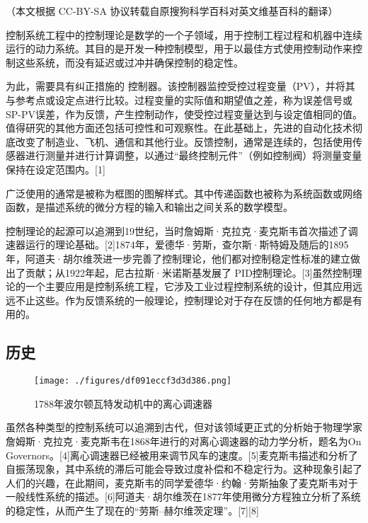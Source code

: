 
（本文根据 CC-BY-SA 协议转载自原搜狗科学百科对英文维基百科的翻译）

控制系统工程中的控制理论是数学的一个子领域，用于控制工程过程和机器中连续运行的动力系统。其目的是开发一种控制模型，用于以最佳方式使用控制动作来控制这些系统，而没有延迟或过冲并确保控制的稳定性。

为此，需要具有纠正措施的 控制器。该控制器监控受控过程变量（PV），并将其与参考点或设定点进行比较。过程变量的实际值和期望值之差，称为误差信号或SP-PV误差，作为反馈，产生控制动作，使受控过程变量达到与设定值相同的值。值得研究的其他方面还包括可控性和可观察性。在此基础上，先进的自动化技术彻底改变了制造业、飞机、通信和其他行业。反馈控制，通常是连续的，包括使用传感器进行测量并进行计算调整，以通过“最终控制元件”（例如控制阀）将测量变量保持在设定范围内。[1]

广泛使用的通常是被称为框图的图解样式。其中传递函数也被称为系统函数或网络函数，是描述系统的微分方程的输入和输出之间关系的数学模型。

控制理论的起源可以追溯到19世纪，当时詹姆斯·克拉克·麦克斯韦首次描述了调速器运行的理论基础。[2]1874年，爱德华·劳斯，查尔斯·斯特姆及随后的1895年，阿道夫·胡尔维茨进一步完善了控制理论，他们都对控制稳定性标准的建立做出了贡献；从1922年起，尼古拉斯·米诺斯基发展了 PID控制理论。[3]虽然控制理论的一个主要应用是控制系统工程，它涉及工业过程控制系统的设计，但其应用远远不止这些。作为反馈系统的一般理论，控制理论对于存在反馈的任何地方都是有用的。

\subsection{历史}

\begin{figure}[ht]
\centering
\texttt{[image: ./figures/df091eccf3d3d386.png]}
\caption{1788年波尔顿瓦特发动机中的离心调速器} \label{fig_KZLL_5}
\end{figure}

虽然各种类型的控制系统可以追溯到古代，但对该领域更正式的分析始于物理学家詹姆斯·克拉克·麦克斯韦在1868年进行的对离心调速器的动力学分析，题名为On Governors。[4]离心调速器已经被用来调节风车的速度。[5]麦克斯韦描述和分析了自振荡现象，其中系统的滞后可能会导致过度补偿和不稳定行为。这种现象引起了人们的兴趣，在此期间，麦克斯韦的同学爱德华·约翰·劳斯抽象了麦克斯韦对于一般线性系统的描述。[6]阿道夫·胡尔维茨在1877年使用微分方程独立分析了系统的稳定性，从而产生了现在的“劳斯–赫尔维茨定理”。[7][8]

